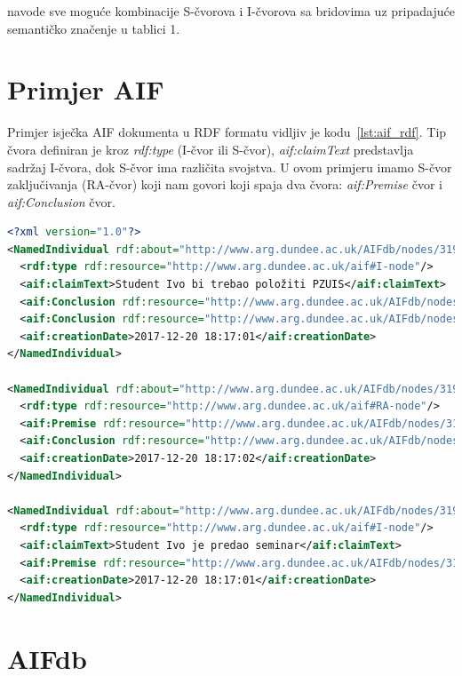 \cite{chesnevar2006towards} navode sve moguće kombinacije S-čvorova i I-čvorova
sa bridovima uz pripadajuće semantičko značenje u tablici 1. 

\section{Primjer AIF}


Primjer isječka AIF dokumenta u RDF formatu vidljiv je kodu~\ref{lst:aif_rdf}.
Tip čvora definiran je kroz \textit{rdf:type} (I-čvor ili S-čvor),
\textit{aif:claimText} predstavlja sadržaj I-čvora, dok S-čvor ima različita
svojstva. U ovom primjeru imamo S-čvor zaključivanja (RA-čvor) koji nam govori
koji spaja dva čvora: \textit{aif:Premise} čvor i \textit{aif:Conclusion} čvor. 

\lstset{language=XML}
\begin{lstlisting}[caption={Primjer AIF RDF dokumenta},label={lst:aif_rdf},language=XML, captionpos=b]
<?xml version="1.0"?>
<NamedIndividual rdf:about="http://www.arg.dundee.ac.uk/AIFdb/nodes/319262">
  <rdf:type rdf:resource="http://www.arg.dundee.ac.uk/aif#I-node"/>
  <aif:claimText>Student Ivo bi trebao položiti PZUIS</aif:claimText>
  <aif:Conclusion rdf:resource="http://www.arg.dundee.ac.uk/AIFdb/nodes/319264"/>
  <aif:Conclusion rdf:resource="http://www.arg.dundee.ac.uk/AIFdb/nodes/319266"/>
  <aif:creationDate>2017-12-20 18:17:01</aif:creationDate>
</NamedIndividual>

<NamedIndividual rdf:about="http://www.arg.dundee.ac.uk/AIFdb/nodes/319264">
  <rdf:type rdf:resource="http://www.arg.dundee.ac.uk/aif#RA-node"/>
  <aif:Premise rdf:resource="http://www.arg.dundee.ac.uk/AIFdb/nodes/319263"/>
  <aif:Conclusion rdf:resource="http://www.arg.dundee.ac.uk/AIFdb/nodes/319262"/>
  <aif:creationDate>2017-12-20 18:17:02</aif:creationDate>
</NamedIndividual>

<NamedIndividual rdf:about="http://www.arg.dundee.ac.uk/AIFdb/nodes/319263">
  <rdf:type rdf:resource="http://www.arg.dundee.ac.uk/aif#I-node"/>
  <aif:claimText>Student Ivo je predao seminar</aif:claimText>
  <aif:Premise rdf:resource="http://www.arg.dundee.ac.uk/AIFdb/nodes/319264"/>
  <aif:creationDate>2017-12-20 18:17:01</aif:creationDate>
</NamedIndividual>
\end{lstlisting}


\section{AIFdb}
\label{sec:aifdb}

